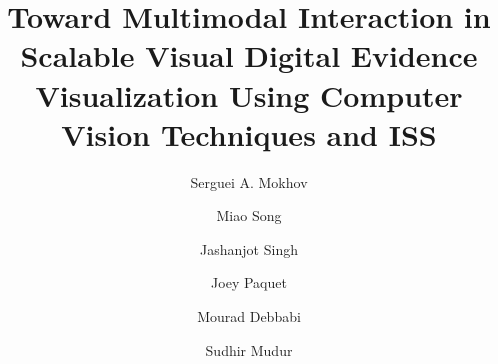 \documentclass{easychair}
\begin{document}
\title{Toward Multimodal Interaction in Scalable Visual Digital Evidence Visualization Using Computer Vision Techniques and ISS}

\author{%
Serguei A. Mokhov\\
\and
Miao Song\\
\and
Jashanjot Singh\\
\and
{Joey Paquet}\\
\and
{Mourad Debbabi}\\
\and
{Sudhir Mudur}\\
}

\maketitle
\end{document}
